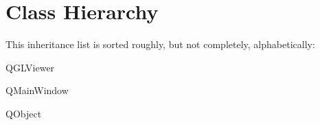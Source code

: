\section{Class Hierarchy}
This inheritance list is sorted roughly, but not completely, alphabetically\+:\begin{DoxyCompactList}
\item Q\+G\+L\+Viewer\begin{DoxyCompactList}
\item {}
\end{DoxyCompactList}
\item Q\+Main\+Window\begin{DoxyCompactList}
\item {}
\end{DoxyCompactList}
\item Q\+Object\begin{DoxyCompactList}
\item {}
\end{DoxyCompactList}
\item {}
\item {}
\end{DoxyCompactList}
